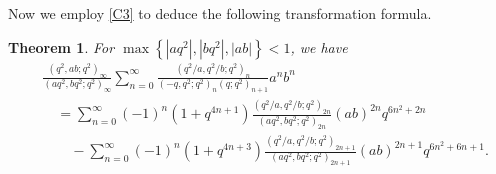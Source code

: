 \documentclass[reqno,12pt]{amsart}
\newtheorem{theorem}{Theorem}[section]%
\theoremstyle{remark}
\numberwithin{equation}{section}
\begin{document}
Now we employ \eqref{C3} to deduce the following transformation formula.
\begin{theorem}\label{T9}
For $\max\left\{|aq^2|,|bq^2|,|ab|\right\}<1$, we have
\begin{align*}
&\frac{\left(q^2,ab;q^2\right)_{\infty}}{\left(aq^2,bq^2;q^2\right)_{\infty}}
\sum_{n=0}^{\infty}\frac{\left(q^2/a,q^2/b;q^2\right)_n}
{\left(-q,q^2;q^2\right)_n\left(q;q^2\right)_{n+1}}a^nb^n\\
&\quad=\sum_{n=0}^{\infty}\left(-1\right)^n\left(1+q^{4n+1}\right)
\frac{\left(q^2/a,q^2/b;q^2\right)_{2n}}{\left(aq^2,bq^2;q^2\right)_{2n}}
\left(ab\right)^{2n}q^{6n^2+2n}\\
&\qquad -\sum_{n=0}^{\infty}\left(-1\right)^n\left(1+q^{4n+3}\right)
\frac{\left(q^2/a,q^2/b;q^2\right)_{2n+1}}{\left(aq^2,bq^2;q^2\right)_{2n+1}}
\left(ab\right)^{2n+1}q^{6n^2+6n+1}
.
\end{align*}
\end{theorem}
\end{document}
